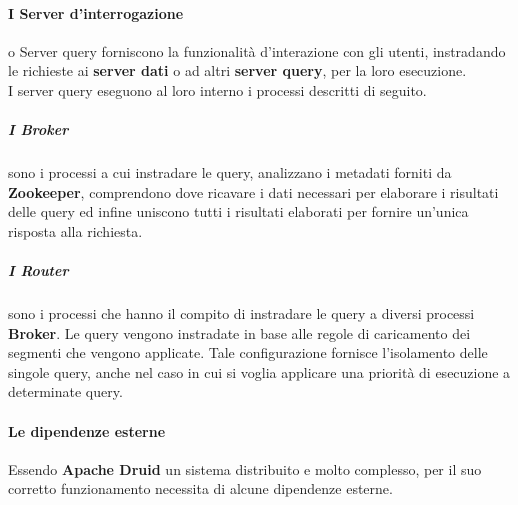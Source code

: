 \paragraph{I Server d'interrogazione} o Server query forniscono la funzionalità d'interazione con gli utenti, instradando le richieste  
ai \textbf{server dati} o ad altri \textbf{server query}, per la loro esecuzione. \\
I server query eseguono al loro interno i processi descritti di seguito.
\subparagraph{I Broker} sono i processi a cui instradare le query, analizzano i \gls{metadati}{} forniti
da \textbf{Zookeeper}, comprendono dove ricavare i dati necessari per elaborare i risultati delle query ed 
infine uniscono tutti i risultati elaborati per fornire un’unica risposta alla richiesta.\\
\subparagraph{I Router} sono i processi che hanno il compito di instradare le query a diversi processi \textbf{Broker}. Le query
vengono instradate in base alle regole di caricamento dei segmenti che vengono applicate.
Tale configurazione fornisce l’isolamento delle singole query, anche nel caso in cui si voglia applicare 
una priorità di esecuzione a determinate query.\\

\paragraph{Le dipendenze esterne}
Essendo \textbf{Apache Druid} un sistema distribuito e molto complesso, per il suo corretto funzionamento necessita di alcune dipendenze esterne.\\

